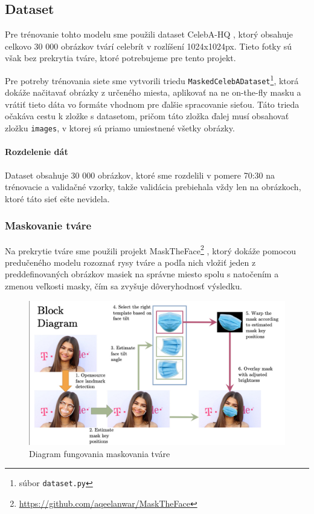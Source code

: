 \documentclass [11pt, a4paper]{article}
\begin{document}
		
		\subsection{Dataset}\label{sec:dataset}
			Pre trénovanie tohto modelu sme použili dataset CelebA-HQ \cite{liu2015faceattributes}, ktorý obsahuje celkovo 30 000 obrázkov tvárí celebrít v rozlíšení 1024x1024px. Tieto fotky sú však bez prekrytia tváre, ktoré potrebujeme pre tento projekt.
			
			Pre potreby trénovania siete sme vytvorili triedu \texttt{MaskedCelebADataset}\footnote{súbor \texttt{dataset.py}}, ktorá dokáže načitavať obrázky z určeného miesta, aplikovať na ne on-the-fly masku a vrátiť tieto dáta vo formáte vhodnom pre ďalšie spracovanie sieťou. Táto trieda očakáva cestu k zložke s datasetom, pričom táto zložka ďalej musí obsahovať zložku \texttt{images}, v ktorej sú priamo umiestnené všetky obrázky.
			
			\paragraph{Rozdelenie dát} Dataset obsahuje 30 000 obrázkov, ktoré sme rozdelili v pomere 70:30 na trénovacie a validačné vzorky, takže validácia prebiehala vždy len na obrázkoch, ktoré táto sieť ešte nevidela.
			
			\subsubsection{Maskovanie tváre}
				Na prekrytie tváre sme použili projekt MaskTheFace\footnote{\url{https://github.com/aqeelanwar/MaskTheFace}} \cite{anwar2020masked}, ktorý dokáže pomocou predučeného modelu rozoznať rysy tváre a podľa nich vložiť jeden z preddefinovaných obrázkov masiek na správne miesto spolu s natočením a zmenou veľkosti masky, čím sa zvyšuje dôveryhodnosť výsledku.
				
				\begin{figure}[h]
					\centering
					\includegraphics[width=0.7\linewidth]{img/mask_the_face-diagram}
					\caption{Diagram fungovania maskovania tváre \cite{anwar2020masked}}
					\label{fig:masktheface-diagram}
				\end{figure}
				
\end{document}
